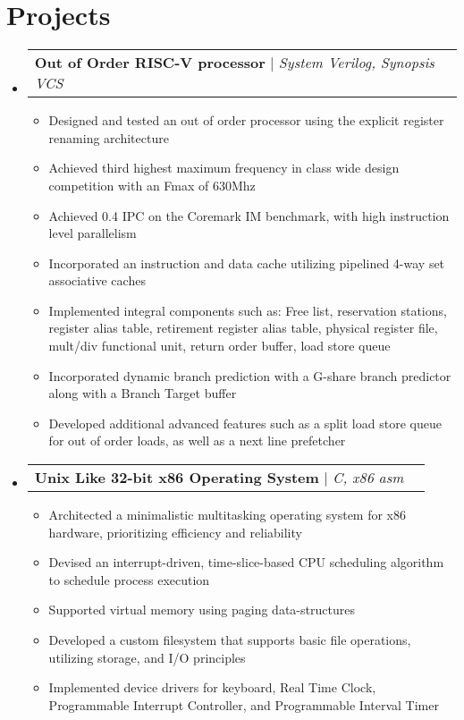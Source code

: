 \documentclass[letterpaper,10pt]{article}
\makeatletter
\newcommand{\resumeItem}[1]{
  \item\small{
    {#1 \vspace{-2pt}}
  }
}
\newcommand{\resumeProjectHeading}[2]{
    \item
    \begin{tabular*}{0.97\textwidth}{l@{\extracolsep{\fill}}r}
      \small#1 & #2 \\
    \end{tabular*}\vspace{-7pt}
}
\newcommand{\resumeSubHeadingListStart}{\begin{itemize}[leftmargin=0.15in, label={}, itemsep=0pt]}
\newcommand{\resumeSubHeadingListEnd}{\end{itemize}}
\newcommand{\resumeItemListStart}{\begin{itemize}}
\newcommand{\resumeItemListEnd}{\end{itemize}\vspace{-5pt}}
\makeatother
\begin{document}
\section{Projects}
\resumeSubHeadingListStart
\resumeProjectHeading
{\textbf{Out of Order RISC-V processor} $|$ \emph{System Verilog, Synopsis VCS}}{}
\resumeItemListStart
\resumeItem{Designed and tested an out of order processor using the explicit register renaming architecture}
\resumeItem{Achieved third highest maximum frequency in class wide design competition with an Fmax of 630Mhz}
\resumeItem{Achieved 0.4 IPC on the Coremark IM benchmark, with high instruction level parallelism}
\resumeItem{Incorporated an instruction and data cache utilizing pipelined 4-way set associative caches}
\resumeItem{Implemented integral components such as: Free list, reservation stations, register alias table, retirement register alias table, physical register file, mult/div functional unit, return order buffer, load store queue}
\resumeItem{Incorporated dynamic branch prediction with a G-share branch predictor along with a Branch Target buffer}
\resumeItem{Developed additional advanced features such as a split load store queue for out of order loads, as well as a next line prefetcher}
\resumeItemListEnd

\resumeProjectHeading
{\textbf{Unix Like 32-bit x86 Operating System} $|$ \emph{C, x86 asm}}{}
\resumeItemListStart
\resumeItem{Architected a minimalistic multitasking operating system for x86 hardware, prioritizing efficiency and reliability}
\resumeItem{Devised an interrupt-driven, time-slice-based CPU scheduling algorithm to schedule process execution}
\resumeItem{Supported virtual memory using paging data-structures}
\resumeItem{Developed a custom filesystem that supports basic file operations, utilizing storage, and I/O principles}
\resumeItem{Implemented device drivers for keyboard, Real Time Clock, Programmable Interrupt Controller, and Programmable Interval Timer}
\resumeItemListEnd

\resumeSubHeadingListEnd
\end{document}
